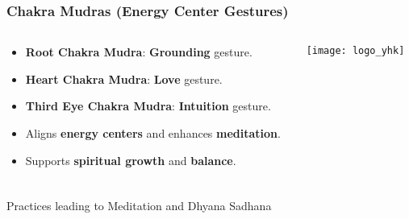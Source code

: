 \begin{frame}[fragile]\frametitle{Chakra Mudras (Energy Center Gestures)}
\begin{columns}
    \begin{column}[T]{0.5\linewidth}
      \begin{itemize}
        \item \textbf{Root Chakra Mudra}: \textbf{Grounding} gesture.
        \item \textbf{Heart Chakra Mudra}: \textbf{Love} gesture.
        \item \textbf{Third Eye Chakra Mudra}: \textbf{Intuition} gesture.
        \item Aligns \textbf{energy centers} and enhances \textbf{meditation}.
        \item Supports \textbf{spiritual growth} and \textbf{balance}.
      \end{itemize}
    \end{column}
    \begin{column}[T]{0.5\linewidth}
        \begin{center}
        \texttt{[image: logo\_yhk]}
        \end{center}	
    \end{column}
\end{columns}
\end{frame}


\begin{frame}[fragile]\frametitle{}
\begin{center}
{\Large Practices leading to Meditation and Dhyana Sadhana }
\end{center}
\end{frame}


